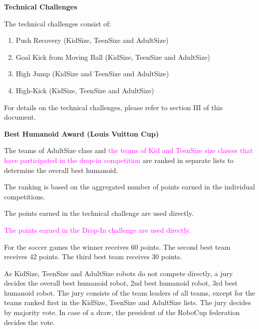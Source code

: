 \color{black}

\bigskip

{\bfseries Technical Challenges}

\headlinebox

The technical challenges consist of:

\begin{enumerate}
\item Push Recovery (KidSize, TeenSize and AdultSize)
\item Goal Kick from Moving Ball (KidSize, TeenSize and AdultSize)
\item High Jump (KidSize and TeenSize and AdultSize)
\item High-Kick (KidSize, TeenSize and AdultSize)
\end{enumerate}

For details on the technical challenges, please refer to section III of this document.

\bigskip

{\bfseries Best Humanoid Award (Louis Vuitton Cup)}

\headlinebox
 
The teams of AdultSize class and \textcolor{magenta}{the teams of Kid and TeenSize size classes that have participated in the drop-in competition} are ranked in separate lists to determine the overall best humanoid.

The ranking is based on the aggregated number of points earned in the individual competitions.

\bigskip

The points earned in the technical challenge are used directly.

\bigskip

\textcolor{magenta}{The points earned in the Drop-In challenge are used directly.}

\bigskip

For the soccer games the winner receives 60 points. The second best team receives 42 points. The third best team receives 30 points.

\bigskip

As KidSize, TeenSize and AdultSize robots do not compete directly, a jury decides the overall best humanoid robot, 2nd best humanoid robot, 3rd best humanoid robot. The jury consists of the team leaders of all teams, except for the teams ranked first in the KidSize, TeenSize and AdultSize lists. The jury decides by majority vote. In case of a draw, the president of the RoboCup federation decides the vote.

